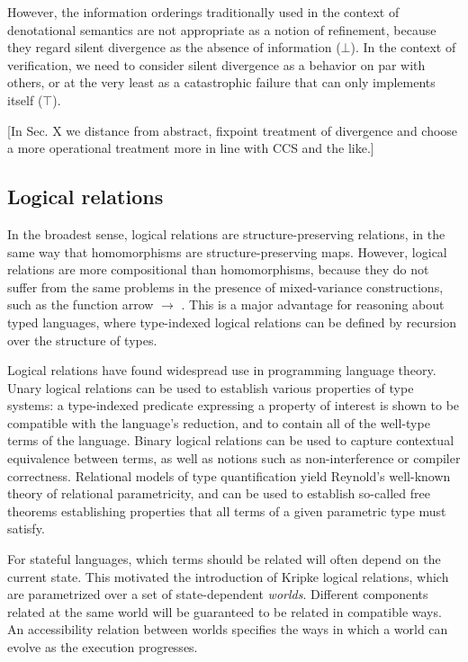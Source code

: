 However,
the information orderings traditionally used
in the context of denotational semantics
are not appropriate as a notion of refinement,
because they regard silent divergence
as the absence of information ($\bot$).
In the context of verification,
we need to consider silent divergence
as a behavior on par with others,
or at the very least as a catastrophic failure
that can only implements itself ($\top$).

[In Sec. X we distance from abstract, fixpoint treatment
of divergence and choose a more operational treatment
more in line with CCS and the like.]


\subsection{Logical relations} %

In the broadest sense,
logical relations are structure-preserving relations,
in the same way that homomorphisms are structure-preserving maps.
However,
logical relations are more compositional than homomorphisms,
because they do not suffer from the same problems
in the presence of mixed-variance constructions,
such as the function arrow $\rightarrow$ \cite{lrp}.
This is a major advantage
for reasoning about typed languages,
where type-indexed logical relations
can be defined by recursion over the structure of types.

Logical relations have found widespread use in programming language theory.
Unary logical relations can be used to establish
various properties of type systems:
a type-indexed predicate expressing a property of interest
is shown to be compatible with the language's reduction,
and to contain all of the well-type terms of the language.
Binary logical relations can be used to capture
contextual equivalence between terms,
as well as notions such as non-interference or compiler correctness.
Relational models of type quantification yield
Reynold's well-known theory of relational parametricity,
and can be used to establish so-called free theorems
establishing properties that
all terms of a given parametric type must satisfy.

For stateful languages,
which terms should be related
will often depend on the current state.
This motivated the introduction of Kripke logical relations,
which are parametrized over a set of state-dependent \emph{worlds}.
Different components related at the same world
will be guaranteed to be related in compatible ways.
An accessibility relation between worlds
specifies the ways in which a world can evolve
as the execution progresses.

